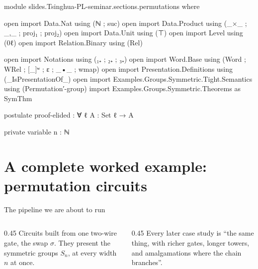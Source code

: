 \begin{code}[hide]
module slides.Tsinghua-PL-seminar.sections.permutations where

open import Data.Nat using (ℕ ; suc)
open import Data.Product using (_×_ ; _,_ ; proj₁ ; proj₂)
open import Data.Unit using (⊤)
open import Level using (0ℓ)
open import Relation.Binary using (Rel)

open import Notations using (₁₊ ; ₂₊ ; ₃₊)
open import Word.Base using (Word ; WRel ; [_]ʷ ; ε ; _•_ ; wmap)
open import Presentation.Definitions using (_IsPresentationOf_)
open import Examples.Groups.Symmetric.Tight.Semantics using (Permutation′-group)
import Examples.Groups.Symmetric.Theorems as SymThm

postulate
  proof-elided : ∀ {ℓ} {A : Set ℓ} → A

private variable
  n : ℕ
\end{code}
\PaperPart
\section{A complete worked example: permutation circuits}

\begin{frame}{The pipeline we are about to run \InPaper}
\centering
{}
\vspace{10pt}

\begin{columns}[T]
\begin{column}{0.45\textwidth}
Circuits built from \alert{one} two-wire gate, the swap $\sigma$.
They present the \alert{symmetric groups} $S_n$, at every width $n$ at once.
\end{column}
\begin{column}{0.45\textwidth}
Every later case study is ``the same thing, with richer gates, longer
towers, and amalgamations where the chain branches''.
\end{column}
\end{columns}
\end{frame}

